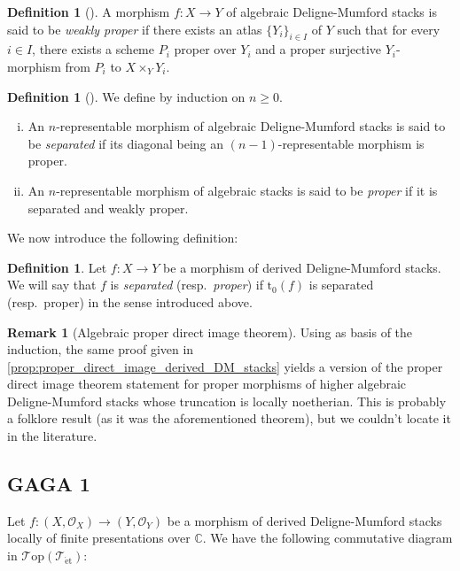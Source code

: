\documentclass[12pt,a4paper,reqno]{amsart}
\theoremstyle{plain}
\theoremstyle{definition}
\newtheorem{defin}[thm]{Definition}
\newtheorem{rem}[thm]{Remark}
\theoremstyle{remark}
\numberwithin{equation}{section}
\begin{document}
\begin{defin}[{\cite[Definition 4.7]{Porta_Yu_Higher_analytic_stacks_2014}}]
	A morphism $f\colon X\to Y$ of algebraic {Deligne-Mumford\xspace} stacks is said to be \emph{weakly proper} if there exists an atlas $\{Y_i\}_{i\in I}$ of $Y$ such that for every $i\in I$,
	there exists a scheme $P_i$ proper over $Y_i$ and a proper surjective $Y_i$-morphism from $P_i$ to $X\times_Y Y_i$.
\end{defin}

\begin{defin}[{\cite[Definition 4.8]{Porta_Yu_Higher_analytic_stacks_2014}}]
	We define by induction on $n\geq 0$.
	\begin{enumerate}[(i)]
		\item An $n$-representable morphism of algebraic {Deligne-Mumford\xspace} stacks is said to be \emph{separated} if its diagonal being an $(n-1)$-representable morphism is proper.
		\item An $n$-representable morphism of algebraic stacks is said to be \emph{proper} if it is separated and weakly proper.
	\end{enumerate}
\end{defin}

We now introduce the following definition:

\begin{defin}
	Let $f \colon X \to Y$ be a morphism of derived {Deligne-Mumford\xspace} stacks.
	We will say that $f$ is \emph{separated} (resp.\ \emph{proper}) if ${\mathrm{t}_0}(f)$ is separated (resp.\ proper) in the sense introduced above.
\end{defin}

\begin{rem}[Algebraic proper direct image theorem]
	Using \cite[Theorem 5.11]{Porta_Yu_Higher_analytic_stacks_2014} as basis of the induction, the same proof given in \cref{prop:proper_direct_image_derived_DM_stacks} yields a version of the proper direct image theorem statement for proper morphisms of higher algebraic {Deligne-Mumford\xspace} stacks whose truncation is locally noetherian. This is probably a folklore result (as it was the aforementioned theorem), but we couldn't locate it in the literature.
\end{rem}

\subsection{GAGA 1}

Let $f \colon (X, {\mathcal O}_X) \to (Y, {\mathcal O}_Y)$ be a morphism of derived {Deligne-Mumford\xspace} stacks locally of finite presentations over $\mathbb C$.
We have the following commutative diagram in ${\mathcal T\mathrm{op}}({{\mathcal T}_{\mathrm{\acute{e}t}}})$:
\end{document}
